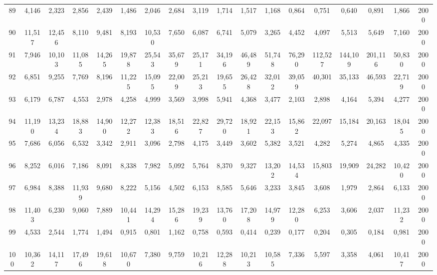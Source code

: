 {\begin{longtable}{ >{\tiny}cccccccccccccccccc}
89  & 4,146  & 2,323  & 2,856  & 2,439  & 1,486  & 2,046  & 2,684  & 3,119  & 1,714  & 1,517  & 1,168  & 0,864  & 0,751   & 0,640   & 0,891   & 1,866  & 2000 \\
90  & 11,517 & 12,456 & 8,110  & 9,481  & 8,193  & 10,530 & 7,650  & 6,087  & 6,741  & 5,079  & 3,265  & 4,452  & 4,097   & 5,513   & 5,649   & 7,160  & 2000 \\
91  & 7,946  & 10,103 & 11,085 & 14,265 & 19,878 & 25,543 & 35,679 & 25,171 & 34,196 & 46,489 & 51,748 & 76,290 & 112,527 & 144,109 & 201,116 & 50,830 & 2000 \\
92  & 6,851  & 9,255  & 7,769  & 8,196  & 11,225 & 15,095 & 22,009 & 25,213 & 19,655 & 26,428 & 32,012 & 39,059 & 40,301  & 35,133  & 46,593  & 22,719 & 2000 \\
93  & 6,179  & 6,787  & 4,553  & 2,978  & 4,258  & 4,999  & 3,569  & 3,998  & 5,941  & 4,368  & 3,477  & 2,103  & 2,898   & 4,164   & 5,394   & 4,277  & 2000 \\
94  & 11,190 & 13,234 & 18,883 & 14,900 & 12,272 & 12,383 & 18,516 & 22,827 & 29,720 & 18,921 & 22,153 & 15,862 & 22,097  & 15,184  & 20,163  & 18,045 & 2000 \\
95  & 7,686  & 6,056  & 6,532  & 3,342  & 2,911  & 3,096  & 2,798  & 4,175  & 3,449  & 3,602  & 5,382  & 3,521  & 4,282   & 5,274   & 4,865   & 4,335  & 2000 \\
96  & 8,252  & 6,016  & 7,186  & 8,091  & 8,338  & 7,982  & 5,092  & 5,764  & 8,370  & 9,327  & 13,202 & 14,534 & 15,803  & 19,909  & 24,282  & 10,420 & 2000 \\
97  & 6,984  & 8,388  & 11,939 & 9,680  & 8,222  & 5,156  & 4,502  & 6,153  & 8,585  & 5,646  & 3,233  & 3,845  & 3,608   & 1,979   & 2,864   & 6,133  & 2000 \\
98  & 11,403 & 6,230  & 9,060  & 7,889  & 10,441 & 14,294 & 15,286 & 19,239 & 13,760 & 17,208 & 14,979 & 12,280 & 6,253   & 3,606   & 2,037   & 11,232 & 2000 \\
99  & 4,533  & 2,544  & 1,774  & 1,494  & 0,915  & 0,801  & 1,162  & 0,758  & 0,593  & 0,414  & 0,239  & 0,177  & 0,204   & 0,305   & 0,184   & 0,981  & 2000 \\
100 & 10,362 & 14,117 & 17,496 & 19,618 & 10,670 & 7,380  & 9,759  & 10,216 & 12,288 & 10,213 & 10,585 & 7,336  & 5,597   & 3,358   & 4,061   & 10,417 & 2000  \\ \hline
\end{longtable}
}
